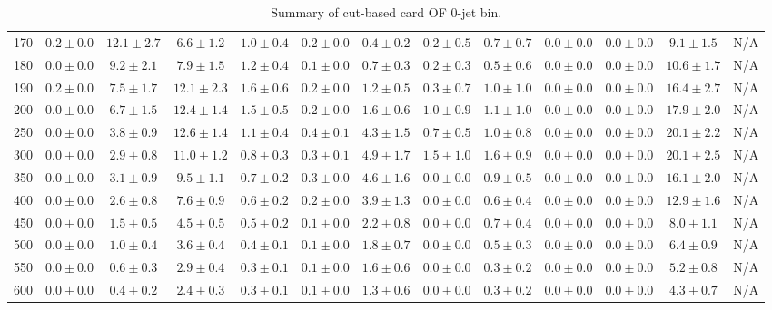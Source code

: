 \begin{table}
{\begin{center}
\begin{tabular}{l | c c | c c c c c c c c  | c c}
170 & $0.2\pm0.0$ & $12.1\pm2.7$ & $6.6\pm1.2$ & $1.0\pm0.4$ & $0.2\pm0.0$ & $0.4\pm0.2$ & $0.2\pm0.5$ & $0.7\pm0.7$ & $0.0\pm0.0$ & $0.0\pm0.0$ & $9.1\pm1.5$ & N/A \\ 
180 & $0.0\pm0.0$ & $9.2\pm2.1$ & $7.9\pm1.5$ & $1.2\pm0.4$ & $0.1\pm0.0$ & $0.7\pm0.3$ & $0.2\pm0.3$ & $0.5\pm0.6$ & $0.0\pm0.0$ & $0.0\pm0.0$ & $10.6\pm1.7$ & N/A \\ 
190 & $0.2\pm0.0$ & $7.5\pm1.7$ & $12.1\pm2.3$ & $1.6\pm0.6$ & $0.2\pm0.0$ & $1.2\pm0.5$ & $0.3\pm0.7$ & $1.0\pm1.0$ & $0.0\pm0.0$ & $0.0\pm0.0$ & $16.4\pm2.7$ & N/A \\
200 & $0.0\pm0.0$ & $6.7\pm1.5$ & $12.4\pm1.4$ & $1.5\pm0.5$ & $0.2\pm0.0$ & $1.6\pm0.6$ & $1.0\pm0.9$ & $1.1\pm1.0$ & $0.0\pm0.0$ & $0.0\pm0.0$ & $17.9\pm2.0$ & N/A \\
250 & $0.0\pm0.0$ & $3.8\pm0.9$ & $12.6\pm1.4$ & $1.1\pm0.4$ & $0.4\pm0.1$ & $4.3\pm1.5$ & $0.7\pm0.5$ & $1.0\pm0.8$ & $0.0\pm0.0$ & $0.0\pm0.0$ & $20.1\pm2.2$ & N/A \\
300 & $0.0\pm0.0$ & $2.9\pm0.8$ & $11.0\pm1.2$ & $0.8\pm0.3$ & $0.3\pm0.1$ & $4.9\pm1.7$ & $1.5\pm1.0$ & $1.6\pm0.9$ & $0.0\pm0.0$ & $0.0\pm0.0$ & $20.1\pm2.5$ & N/A \\
350 & $0.0\pm0.0$ & $3.1\pm0.9$ & $9.5\pm1.1$ & $0.7\pm0.2$ & $0.3\pm0.0$ & $4.6\pm1.6$ & $0.0\pm0.0$ & $0.9\pm0.5$ & $0.0\pm0.0$ & $0.0\pm0.0$ & $16.1\pm2.0$ & N/A \\
400 & $0.0\pm0.0$ & $2.6\pm0.8$ & $7.6\pm0.9$ & $0.6\pm0.2$ & $0.2\pm0.0$ & $3.9\pm1.3$ & $0.0\pm0.0$ & $0.6\pm0.4$ & $0.0\pm0.0$ & $0.0\pm0.0$ & $12.9\pm1.6$ & N/A \\
450 & $0.0\pm0.0$ & $1.5\pm0.5$ & $4.5\pm0.5$ & $0.5\pm0.2$ & $0.1\pm0.0$ & $2.2\pm0.8$ & $0.0\pm0.0$ & $0.7\pm0.4$ & $0.0\pm0.0$ & $0.0\pm0.0$ & $8.0\pm1.1$ & N/A \\ 
500 & $0.0\pm0.0$ & $1.0\pm0.4$ & $3.6\pm0.4$ & $0.4\pm0.1$ & $0.1\pm0.0$ & $1.8\pm0.7$ & $0.0\pm0.0$ & $0.5\pm0.3$ & $0.0\pm0.0$ & $0.0\pm0.0$ & $6.4\pm0.9$ & N/A \\ 
550 & $0.0\pm0.0$ & $0.6\pm0.3$ & $2.9\pm0.4$ & $0.3\pm0.1$ & $0.1\pm0.0$ & $1.6\pm0.6$ & $0.0\pm0.0$ & $0.3\pm0.2$ & $0.0\pm0.0$ & $0.0\pm0.0$ & $5.2\pm0.8$ & N/A \\ 
600 & $0.0\pm0.0$ & $0.4\pm0.2$ & $2.4\pm0.3$ & $0.3\pm0.1$ & $0.1\pm0.0$ & $1.3\pm0.6$ & $0.0\pm0.0$ & $0.3\pm0.2$ & $0.0\pm0.0$ & $0.0\pm0.0$ & $4.3\pm0.7$ & N/A \\ 
\hline
\end{tabular}
\end{center}
}
\caption{Summary of cut-based card OF 0-jet bin.}
\end{table}
